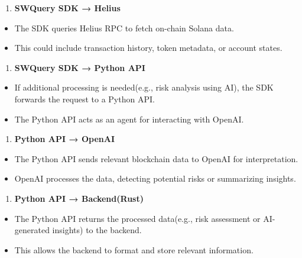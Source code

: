 \documentclass[
]{article}
\providecommand{\tightlist}{%
  \setlength{\itemsep}{0pt}\setlength{\parskip}{0pt}}
\begin{document}
\begin{enumerate}
\def\labelenumi{\arabic{enumi}.}
\setcounter{enumi}{2}
\tightlist
\item
  \textbf{SWQuery SDK → Helius}
\end{enumerate}

\begin{itemize}
\tightlist
\item
  The SDK queries Helius RPC to fetch on-chain Solana data.
\item
  This could include transaction history, token metadata, or account
  states.
\end{itemize}

\begin{enumerate}
\def\labelenumi{\arabic{enumi}.}
\setcounter{enumi}{3}
\tightlist
\item
  \textbf{SWQuery SDK → Python API}
\end{enumerate}

\begin{itemize}
\tightlist
\item
  If additional processing is needed(e.g., risk analysis using AI), the
  SDK forwards the request to a Python API.
\item
  The Python API acts as an agent for interacting with OpenAI.
\end{itemize}

\begin{enumerate}
\def\labelenumi{\arabic{enumi}.}
\setcounter{enumi}{4}
\tightlist
\item
  \textbf{Python API → OpenAI}
\end{enumerate}

\begin{itemize}
\tightlist
\item
  The Python API sends relevant blockchain data to OpenAI for
  interpretation.
\item
  OpenAI processes the data, detecting potential risks or summarizing
  insights.
\end{itemize}

\begin{enumerate}
\def\labelenumi{\arabic{enumi}.}
\setcounter{enumi}{5}
\tightlist
\item
  \textbf{Python API → Backend(Rust)}
\end{enumerate}

\begin{itemize}
\tightlist
\item
  The Python API returns the processed data(e.g., risk assessment or
  AI-generated insights) to the backend.
\item
  This allows the backend to format and store relevant information.
\end{itemize}
\end{document}
